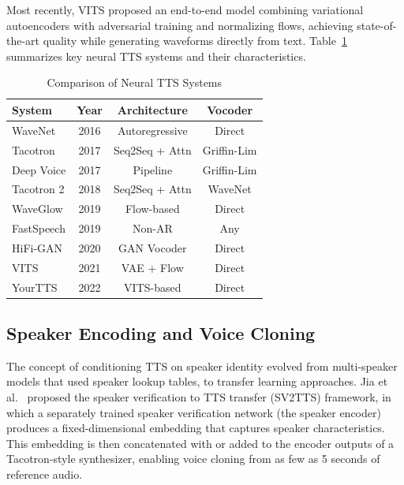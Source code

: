 \documentclass[conference]{IEEEtran}
\begin{document}
Most recently, VITS \cite{kim2021vits} proposed an end-to-end model combining variational autoencoders with adversarial training and normalizing flows, achieving state-of-the-art quality while generating waveforms directly from text. Table~\ref{tab:tts_comparison} summarizes key neural TTS systems and their characteristics.

\begin{table}[htbp]
\caption{Comparison of Neural TTS Systems}
\label{tab:tts_comparison}
\centering
\begin{tabular}{@{}lccc@{}}
\toprule
\textbf{System} & \textbf{Year} & \textbf{Architecture} & \textbf{Vocoder} \\
\midrule
WaveNet \cite{oord2016wavenet} & 2016 & Autoregressive & Direct \\
Tacotron \cite{wang2017tacotron} & 2017 & Seq2Seq + Attn & Griffin-Lim \\
Deep Voice \cite{arik2017deep} & 2017 & Pipeline & Griffin-Lim \\
Tacotron 2 \cite{shen2018tacotron2} & 2018 & Seq2Seq + Attn & WaveNet \\
WaveGlow \cite{prenger2019waveglow} & 2019 & Flow-based & Direct \\
FastSpeech \cite{ren2019fastspeech} & 2019 & Non-AR & Any \\
HiFi-GAN \cite{kong2020hifigan} & 2020 & GAN Vocoder & Direct \\
VITS \cite{kim2021vits} & 2021 & VAE + Flow & Direct \\
YourTTS \cite{casanova2022yourtts} & 2022 & VITS-based & Direct \\
\bottomrule
\end{tabular}
\end{table}

\subsection{Speaker Encoding and Voice Cloning}

The concept of conditioning TTS on speaker identity evolved from multi-speaker models \cite{arik2017deep2, gibiansky2017deep3} that used speaker lookup tables, to transfer learning approaches. Jia et al.\ \cite{jia2018transfer} proposed the speaker verification to TTS transfer (SV2TTS) framework, in which a separately trained speaker verification network (the speaker encoder) produces a fixed-dimensional embedding that captures speaker characteristics. This embedding is then concatenated with or added to the encoder outputs of a Tacotron-style synthesizer, enabling voice cloning from as few as 5 seconds of reference audio.
\end{document}
